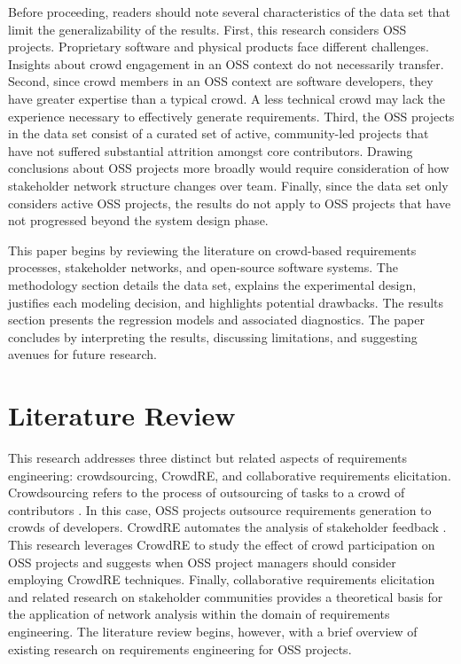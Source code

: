 Before proceeding, readers should note several characteristics of the data set that limit the generalizability of the results. First, this research considers OSS projects. Proprietary software and physical products face different challenges. Insights about crowd engagement in an OSS context do not necessarily transfer. Second, since crowd members in an OSS context are software developers, they have greater expertise than a typical crowd. A less technical crowd may lack the experience necessary to effectively generate requirements. Third, the OSS projects in the data set consist of a curated set of active, community-led projects that have not suffered substantial attrition amongst core contributors. Drawing conclusions about OSS projects more broadly would require consideration of how stakeholder network structure changes over team. Finally, since the data set only considers active OSS projects, the results do not apply to OSS projects that have not progressed beyond the system design phase.

This paper begins by reviewing the literature on crowd-based requirements processes, stakeholder networks, and open-source software systems. The methodology section details the data set, explains the experimental design, justifies each modeling decision, and highlights potential drawbacks. The results section presents the regression models and associated diagnostics. The paper concludes by interpreting the results, discussing limitations, and suggesting avenues for future research.

\section{Literature Review}
\label{litreview}

This research addresses three distinct but related aspects of requirements engineering: crowdsourcing, CrowdRE, and collaborative requirements elicitation. Crowdsourcing refers to the process of outsourcing of tasks to a crowd of contributors \cite{howe, howe2}. In this case, OSS projects outsource requirements generation to crowds of developers. CrowdRE automates the analysis of stakeholder feedback \cite{groen}. This research leverages CrowdRE to study the effect of crowd participation on OSS projects and suggests when OSS project managers should consider employing CrowdRE techniques. Finally, collaborative requirements elicitation and related research on stakeholder communities provides a theoretical basis for the application of network analysis within the domain of requirements engineering. The literature review begins, however, with a brief overview of existing research on requirements engineering for OSS projects.  

